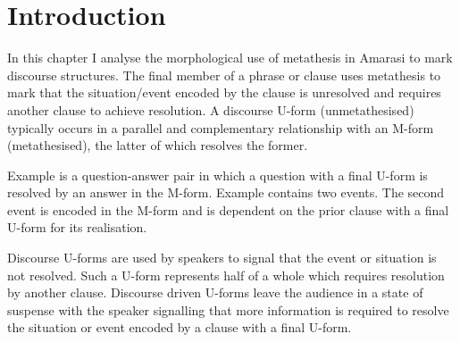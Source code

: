 \section{Introduction}
In this chapter I analyse the morphological use of metathesis
in Amarasi to mark discourse structures.
The final member of a phrase or clause uses
metathesis to mark that the situation/event encoded
by the clause is unresolved and requires another clause to achieve resolution.
A discourse U-form (unmetathesised) typically
occurs in a parallel and complementary relationship
with an M-form (metathesised), the latter of which resolves the former.

Example  is a question-answer
pair in which a question with a final U-form
is resolved by an answer in the M-form.
Example  contains two events.
The second event is encoded in the M-form and is dependent
on the prior clause with a final U-form for its realisation.

\begin{exe}
	\vspace{4pt}\label{ex:02/08/13, p.20 -2} 
	\label{ex:130909-6, 0.39 -2}
\end{exe}

Discourse U-forms are used by speakers to signal that
the event or situation is not resolved.
Such a U-form represents half of a whole
which requires resolution by another clause.
Discourse driven U-forms leave the audience in a state of  suspense
with the speaker signalling that more information
is required to resolve the situation or event
encoded by a clause with a final U-form.

